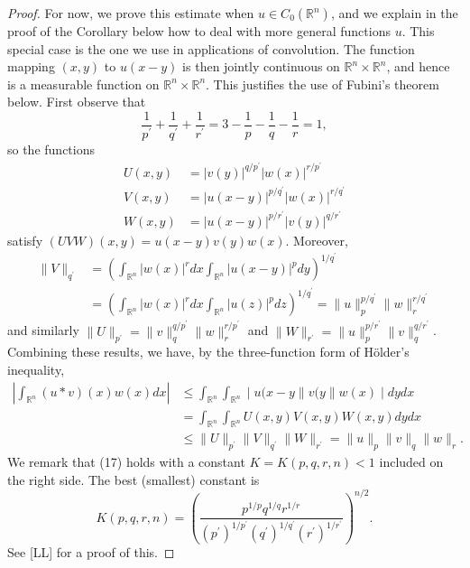 \begin{proof}
  For now, we prove this estimate when $u \in C_0(\mathbb{R}^n)$,
  and we explain in the proof of the Corollary below how to deal with more general functions $u$. 
  This special case is the one we use in applications of convolution.
  The function mapping $(x, y)$ to $u(x-y)$ is then jointly continuous
  on $\mathbb{R}^n \times \mathbb{R}^n$, and hence is a measurable function
  on $\mathbb{R}^n \times \mathbb{R}^n$. This justifies the use of Fubini's theorem below.
  First observe that
  \[
  \frac{1}{p^{\prime}}+\frac{1}{q^{\prime}}+\frac{1}{r^{\prime}}
    = 3 - \frac{1}{p} - \frac{1}{q} - \frac{1}{r} = 1,
  \]
  so the functions
  \[
  \begin{aligned}
  U(x, y) & = |v(y)|^{q / p^{\prime}}|w(x)|^{r / p^{\prime}} \\
  V(x, y) & = |u(x-y)|^{p / q^{\prime}}|w(x)|^{r / q^{\prime}} \\
  W(x, y) & = |u(x-y)|^{p / r^{\prime}}|v(y)|^{q / r^{\prime}}
  \end{aligned}
  \]
  satisfy $(U V W)(x, y)=u(x-y) v(y) w(x)$. Moreover,
  \[
  \begin{aligned}
  \|V\|_{q^{\prime}} & =\left(\int_{\mathbb{R}^n}|w(x)|^r d x \int_{\mathbb{R}^n}|u(x-y)|^p d y\right)^{1 / q^{\prime}} \\
  & =\left(\int_{\mathbb{R}^n}|w(x)|^r d x \int_{\mathbb{R}^n}|u(z)|^p d z\right)^{1 / q^{\prime}}=\|u\|_p^{p / q^{\prime}}\|w\|_r^{r / q^{\prime}}
  \end{aligned}
  \]
  and similarly $\|U\|_{p^{\prime}}=\|v\|_q^{q / p^{\prime}}\|w\|_r^{r / p^{\prime}}$ and $\|W\|_{r^{\prime}}=\|u\|_p^{p / r^{\prime}}\|v\|_q^{q / r^{\prime}}$. Combining these results, we have, by the three-function form of Hölder's inequality,
  \[
  \begin{aligned}
  \left|\int_{\mathbb{R}^n}(u * v)(x) w(x) d x\right| & \leq \int_{\mathbb{R}^n} \int_{\mathbb{R}^n} \mid u(x-y \| v(y \| w(x) \mid d y d x \\
  & =\int_{\mathbb{R}^n} \int_{\mathbb{R}^n} U(x, y) V(x, y) W(x, y) d y d x \\
  & \leq\|U\|_{p^{\prime}}\|V\|_{q^{\prime}}\|W\|_{r^{\prime}}=\|u\|_p\|v\|_q\|w\|_r.
  \end{aligned}
  \]
  We remark that (17) holds with a constant $K=K(p, q, r, n)<1$ included on the right side. The best (smallest) constant is
  \[
  K(p, q, r, n) = \left(\frac{p^{1 / p} q^{1 / q} r^{1 / r}}{\left(p^{\prime}\right)^{1 / p^{\prime}}\left(q^{\prime}\right)^{1 / q^{\prime}}\left(r^{\prime}\right)^{1 / r^{\prime}}}\right)^{n / 2}.
  \]
  See [LL] for a proof of this.
\end{proof}


